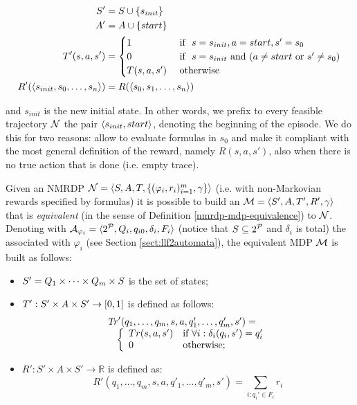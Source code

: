 \begin{gather}
	\begin{split}
	S' &= S\cup \{s_{init}\}\\
	A' &= A\cup \{start\}\\
	T'(s,a,s')  &=  \begin{cases}
			1 & \ \text{if\ }\  s=s_{init}, a=start, s'=s_0\\
			0 & \ \text{if\ }\  s=s_{init} \ \text{and}\  (a\neq start \ \text{or}\  s'\neq s_0)\\
			T(s, a, s') &  \ \text{otherwise}\ \\
		\end{cases}\\
	R'(\langle s_{init}, s_0, \dots, s_n \rangle) &= R(\langle s_0, s_1, \dots, s_n \rangle)
	\end{split}
	\label{def:nmrdp-with-dummy-initial-state}
\end{gather}

and $s_{init}$ is the new initial state. In other words, we prefix to every feasible trajectory $\mathcal{N}$ the pair $\langle s_{init}, start \rangle$, denoting the beginning of the episode. 
We do this for two reasons: allow to evaluate formulas in $s_0$ and make it compliant with the most general definition of the reward, namely $R(s, a, s')$, also when there is no true action that is done (i.e. empty trace).

\begin{definition}\label{nmrdp-mdp-transformation-brafman}
	Given an NMRDP $\mathcal{N} = \langle S, A, T, \{(\varphi_i, r_i)^m_{i=1}, \gamma\} \rangle$ (i.e. with non-Markovian rewards specified by \LLf formulas) it is possible to build an $\mathcal{M} = \langle S', A, T', R', \gamma \rangle$ that is \emph{equivalent} (in the sense of Definition \ref{nmrdp-mdp-equivalence}) to $\mathcal{N}$. Denoting with 
	$\mathcal{A}_{\varphi_i} = \langle 2^{\mathcal{P}}, Q_i, q_{i0}, \delta_i,F_i \rangle$ (notice that $S\subseteq 2^{\mathcal{P}}$ and $\delta_i$ is total) the \DFA associated 
	with $\varphi_i$ (see Section \ref{sect:llf2automata}), the equivalent MDP $\mathcal{M}$ is built as follows:
	\begin{itemize}
		\itemsep=0mm
		\item $S'=Q_1\times\cdots\times Q_m\times S$ is the set of states;
		\item $T' : S'\times A \times S'\rightarrow [0,1]$ is defined as follows:
		\[
		\begin{array}{l}
		\mathit{Tr}'(q_1,\ldots,q_m, s, a, q'_1,\ldots,q'_m, s') = {}\\
		\quad\left\{
		\begin{array}{ll}\label{tr-fun-expanded-mdp}
			Tr(s,a,s') &\mbox{if } \forall i:\delta_i(q_i,s') = q'_i\\
			0 & \mbox{otherwise}; 
			\end{array}\right.
		\end{array}
		\] 
		\item $R': S'\times A \times S'\rightarrow 
		\mathbb{R}$ is defined as:
		\[
		R'(q_1,\ldots,q_m, s, a, q'_1,\ldots,q'_m, s') = 
		\sum_{i: q_i'\in F_i} r_i
		\] 
	\end{itemize}
\end{definition}


